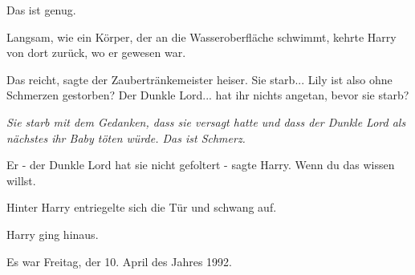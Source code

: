 \glqq{}Das ist genug.\grqq{}

Langsam, wie ein Körper, der an die Wasseroberfläche schwimmt, kehrte Harry von
dort zurück, wo er gewesen war.

\glqq{}Das reicht\grqq{}, sagte der Zaubertränkemeister heiser. \glqq{}Sie
starb... Lily ist also ohne Schmerzen gestorben? Der Dunkle Lord... hat ihr
nichts angetan, bevor sie starb?\grqq{}

\emph{Sie starb mit dem Gedanken, dass sie versagt hatte und dass der Dunkle
Lord als nächstes ihr Baby töten würde. Das ist Schmerz.}

\glqq{}Er - der Dunkle Lord hat sie nicht gefoltert -\grqq{} sagte Harry. \glqq{}
Wenn du das wissen willst.\grqq{}

Hinter Harry entriegelte sich die Tür und schwang auf.

Harry ging hinaus.

Es war Freitag, der 10. April des Jahres 1992.

